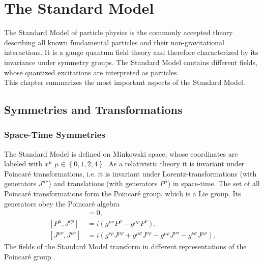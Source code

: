 \section{The Standard Model}
The Standard Model of particle physics is the commonly accepted theory describing all known fundamental particles and their non-gravitational interactions. It is a gauge quantum field theory and therefore characterized by its invariance under symmetry groups. The Standard Model contains different fields, whose quantized excitations are interpreted as particles.\\
This chapter summarizes the most important aspects of the Standard Model.


\subsection{Symmetries and Transformations}
\subsubsection*{Space-Time Symmetries}
The Standard Model is defined on Minkowski space, whose coordinates are labeled with $x^\mu$ $\mu \in \left\{0,1,2,4\right\}$. As a relativistic theory it is invariant under Poincaré transformations, i.e. it is invariant under Lorentz-transformations (with generators $J^{\mu\nu}$) and translations (with generators $P^\mu$) in space-time. The set of all Poincaré transformations form the Poincaré group, which is a Lie group. Its generators obey the Poincaré algebra
\begin{align}
[P^\mu,P^\nu] &= 0,\nonumber\\
[P^\mu,J^{\nu\rho}] &= i(g^{\mu\nu} P^\rho - g^{\mu\rho}P^\nu),\nonumber\\
[J^{\mu\nu},J^{\rho\sigma}] &= i(g^{\nu\rho}J^{\mu\rho} + g^{\mu\sigma}J^{\nu\rho} - g^{\mu\rho}J^{\nu\sigma} - g^{\nu\sigma}J^{\mu\rho}).\label{eq:PoincareAlgebra}
\end{align}
The fields of the Standard Model transform in different representations of the Poincaré group \cite{book:17018}. 


